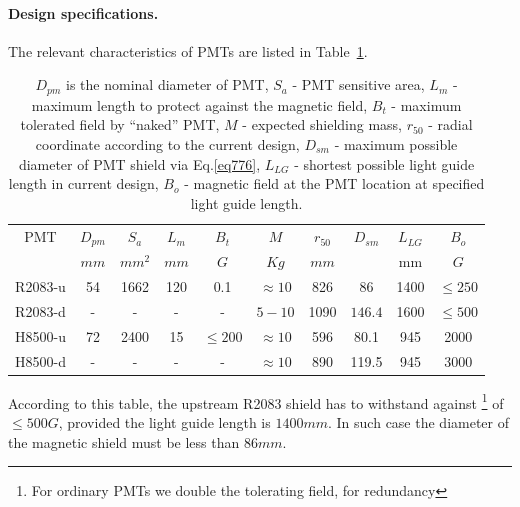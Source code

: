 \documentclass[12pt]{article}
\begin{document}
\paragraph{Design specifications.}
The relevant characteristics of PMTs are listed in Table~\ref{descon}.
\begin{table}[htbp]
\begin{center}
\begin{tabular}{|c|c|c|c|c|c|c|c|c|c|}  \hline
PMT         &$D_{pm}$& $S_a$  & $L_{m}$  &$B_{t}$  & $M$       &$r_{50}$&$D_{sm}$&$L_{LG}$& $B_{o}$   \\
            &$mm$     & $mm^2$ & $mm$     &$G$     & $Kg$      & $mm$   &        &  mm    & $G$     \\ \hline
%
R2083-u     &54       &1662    &120       &0.1      & $\approx10$    & 826    &  86  & 1400   & $\leq250$      \\
R2083-d     &-        &  -     & -        &  -      & $5-10$    & 1090   & $146.4$  & 1600   & $\leq500$     \\ \hline
H8500-u     &72       &2400    &15        &$\leq200$  &$\approx10$&  596   &  80.1  & 945    & 2000     \\
H8500-d     & -       &  -     & -        &  -       &$\approx10$& 890    & 119.5  & 945    & 3000     \\ \hline
\end{tabular}
\end{center}
\caption{
$D_{pm}$ is the nominal  diameter of PMT,
$S_a$ - PMT sensitive area,
$L_{m}$ - maximum length to protect against the magnetic field,
$B_{t}$ - maximum tolerated field by ``naked'' PMT,
$M$       - expected  shielding mass,
$r_{50}$  - radial coordinate according to the current design,
$D_{sm}$  - maximum possible diameter of PMT shield via  Eq.\ref{eq776},
$L_{LG}$  - shortest possible light guide length in current design,
$B_{o}$   - magnetic field at the PMT location at specified light guide length. 
\label{descon} }
\end{table}
%
According to this table, the upstream R2083 shield has to withstand 
against
\footnote{For ordinary PMTs we double the tolerating field, for redundancy} 
of $\leq 500G$, provided the light guide length is $1400mm$. 
In such case the diameter of the magnetic shield must be less than $86mm$.
\end{document}
